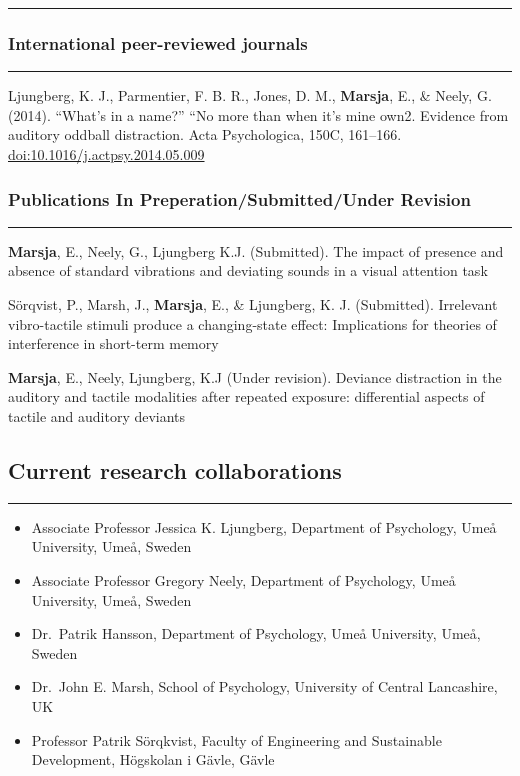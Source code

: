 \documentclass[]{article}
\providecommand{\tightlist}{%
  \setlength{\itemsep}{0pt}\setlength{\parskip}{0pt}}
\begin{document}
\hrule

\subsubsection{International peer-reviewed
journals}\label{international-peer-reviewed-journals}

\hrule

Ljungberg, K. J., Parmentier, F. B. R., Jones, D. M., \textbf{Marsja},
E., \& Neely, G. (2014). ``What's in a name?'' ``No more than when it's
mine own2. Evidence from auditory oddball distraction. Acta
Psychologica, 150C, 161--166. \url{doi:10.1016/j.actpsy.2014.05.009}

\subsubsection{Publications In Preperation/Submitted/Under
Revision}\label{publications-in-preperationsubmittedunder-revision}

\hrule

\textbf{Marsja}, E., Neely, G., Ljungberg K.J. (Submitted). The impact
of presence and absence of standard vibrations and deviating sounds in a
visual attention task

Sörqvist, P., Marsh, J., \textbf{Marsja}, E., \& Ljungberg, K. J.
(Submitted). Irrelevant vibro-tactile stimuli produce a changing-state
effect: Implications for theories of interference in short-term memory

\textbf{Marsja}, E., Neely, Ljungberg, K.J (Under revision). Deviance
distraction in the auditory and tactile modalities after repeated
exposure: differential aspects of tactile and auditory deviants

\subsection{Current research
collaborations}\label{current-research-collaborations}

\hrule

\begin{itemize}
\tightlist
\item
  Associate Professor Jessica K. Ljungberg, Department of Psychology,
  Umeå University, Umeå, Sweden
\item
  Associate Professor Gregory Neely, Department of Psychology, Umeå
  University, Umeå, Sweden
\item
  Dr.~Patrik Hansson, Department of Psychology, Umeå University, Umeå,
  Sweden
\item
  Dr.~John E. Marsh, School of Psychology, University of Central
  Lancashire, UK
\item
  Professor Patrik Sörqkvist, Faculty of Engineering and Sustainable
  Development, Högskolan i Gävle, Gävle
\end{itemize}
\end{document}
